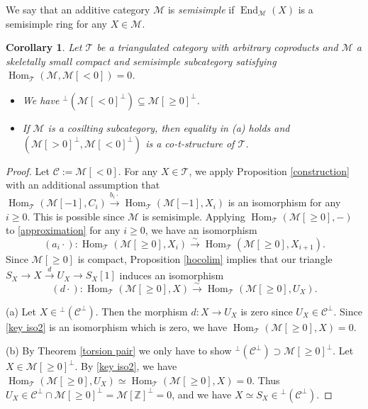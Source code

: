 \documentclass[a4paper,reqno]{amsart}
\newtheorem{corollary}[theorem]{Corollary}
\theoremstyle{definition}
\newcommand{\CC}{{\mathcal C}}
\newcommand{\TT}{{\mathcal T}}
\newcommand{\MM}{{\mathcal M}}
\newcommand{\Z}{\mathbb{Z}}
\newcommand{\Hom}{\operatorname{Hom}\nolimits}
\newcommand{\End}{\operatorname{End}\nolimits}
\begin{document}
We say that an additive category $\MM$ is \emph{semisimple}
if  $\End_{\MM}(X)$ is a semisimple ring for any $X\in\MM$.

\begin{corollary}\label{Pauksztello}
Let $\TT$ be a triangulated category with arbitrary coproducts and $\MM$ a skeletally small compact and semisimple subcategory satisfying $\Hom_{\TT}(\MM,\MM[<0])=0$.
\begin{itemize}
\item[(a)] We have ${}^\perp(\MM[<0]^\perp)\subseteq\MM[\ge0]^\perp$.
\item[(b)] If $\MM$ is a cosilting subcategory, then equality in (a) holds and $(\MM[>0]^\perp,\MM[<0]^\perp)$ is a co-t-structure of $\TT$.
\end{itemize}
\end{corollary}

\begin{proof}
Let $\CC:=\MM[<0]$. 
For any $X\in\TT$, we apply Proposition \ref{construction} with an additional assumption
that $\Hom_{\TT}(\MM[-1],C_i)\xrightarrow{b_i\cdot}\Hom_{\TT}(\MM[-1],X_i)$ is an isomorphism for any $i\ge0$. This is possible since $\MM$ is semisimple.
Applying $\Hom_{\TT}(\MM[\ge0],-)$ to \eqref{approximation} for any $i\ge0$, we have an isomorphism
\[(a_i\cdot):\Hom_{\TT}(\MM[\ge0],X_i)\xrightarrow{\sim}\Hom_{\TT}(\MM[\ge0],X_{i+1}).\]
Since $\MM[\ge0]$ is compact, Proposition \ref{hocolim} implies that our triangle $S_X\to X\stackrel{d}{\to} U_X\to S_X[1]$ induces an isomorphism
\begin{equation}\label{key iso2}
(d\cdot):\Hom_{\TT}(\MM[\ge0],X)\xrightarrow{\sim}\Hom_{\TT}(\MM[\ge0],U_X).
\end{equation}

(a) Let $X\in{}^\perp(\CC^\perp)$. Then the morphism $d:X\to U_X$ is zero since $U_X\in\CC^\perp$.
Since \eqref{key iso2} is an isomorphism which is zero, we have $\Hom_{\TT}(\MM[\ge0],X)=0$.

(b) By Theorem \ref{torsion pair} we only have to show ${}^\perp(\CC^\perp)\supset\MM[\ge0]^\perp$.
Let $X\in\MM[\ge0]^\perp$. By \eqref{key iso2}, we have $\Hom_{\TT}(\MM[\ge0],U_X)\simeq\Hom_{\TT}(\MM[\ge0],X)=0$.
Thus $U_X\in\CC^\perp\cap\MM[\ge0]^\perp=\MM[\Z]^\perp=0$, and we have $X\simeq S_X\in{}^\perp(\CC^\perp)$.
\end{proof}


\end{document}
